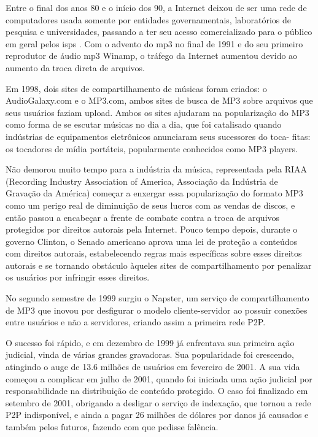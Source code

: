 \cite{site:wiki-fs}
\cite{site:wiki-fs-timeline}

Entre o final dos anos 80 e o início dos 90, a Internet deixou de ser uma rede de
computadores usada somente por entidades governamentais, laboratórios de pesquisa e
universidades, passando a ter seu acesso comercializado para o público em geral pelos
\glspl{isp} \cite{site:wiki-isp}. Com o advento do \gls{mp3} no final de 1991
 e do seu primeiro reprodutor de
áudio \gls{mp3} \cite{site:wiki-mp3} Winamp, o tráfego da Internet aumentou devido ao aumento da troca direta de arquivos.

Em 1998, dois sites de compartilhamento de músicas foram criados: o AudioGalaxy.com e o
MP3.com, ambos sites de busca de MP3 sobre arquivos que seus usuários
faziam upload. Ambos os sites ajudaram na popularização do MP3 como forma de se escutar
músicas no dia a dia, que foi catalisado quando indústrias de equipamentos eletrônicos
anunciaram seus sucessores do toca- fitas: os tocadores de mídia portáteis, popularmente
conhecidos como MP3 players.

Não demorou muito tempo para a indústria da música, representada pela RIAA (Recording
Industry Association of America, Associação da Indústria de Gravação da América) começar
a enxergar essa popularização do formato MP3 como um perigo real de diminuição de seus
lucros com as vendas de discos, e então passou a encabeçar a frente de combate contra a
troca de arquivos protegidos por direitos autorais pela Internet. Pouco tempo depois,
durante o governo Clinton, o Senado americano aprova uma lei de proteção a conteúdos com
direitos autorais, estabelecendo regras mais específicas sobre esses direitos autorais e
se tornando obstáculo àqueles sites de compartilhamento por penalizar os usuários por
infringir esses direitos.

No segundo semestre de 1999 surgiu o Napster, um serviço de compartilhamento de MP3 que
inovou por desfigurar o modelo cliente-servidor ao possuir conexões entre usuários e não
a servidores, criando assim a primeira rede P2P.

O sucesso foi rápido, e em dezembro de 1999 já enfrentava sua primeira ação judicial,
vinda de várias grandes gravadoras. Sua popularidade foi crescendo, atingindo o auge de
13.6 milhões de usuários em fevereiro de 2001. A sua vida começou a complicar em julho de
2001, quando foi iniciada uma ação judicial por responsabilidade na distribuição de
conteúdo protegido. O caso foi finalizado em setembro de 2001, obrigando a desligar o
serviço de indexação, que tornou a rede P2P indisponível, e ainda a pagar 26 milhões de
dólares por danos já causados e também pelos futuros, fazendo com que pedisse falência.

